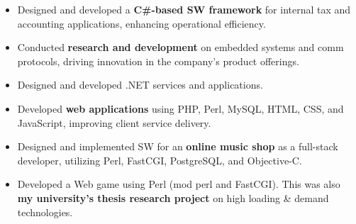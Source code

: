 \documentclass[10pt,a4paper]{altacv}
\begin{document}
\divider

\begin{itemize}
	\item Designed and developed a \textbf{C{\#}-based SW framework} for internal tax and accounting applications, enhancing operational efficiency.
\end{itemize}

\vfil \break

{}

\begin{itemize}
	\item Conducted \textbf{research and development} on embedded systems and comm protocols, driving innovation in the company’s product offerings.
	\item Designed and developed .NET services and applications.
\end{itemize}

\divider

\begin{itemize}
	\item Developed \textbf{web applications} using PHP, Perl, MySQL, HTML, CSS, and JavaScript, improving client service delivery.
\end{itemize}

\divider

\begin{itemize}
	\item Designed and implemented SW for an \textbf{online music shop} as a full-stack developer, utilizing Perl, FastCGI, PostgreSQL, and Objective-C.
\end{itemize}

\divider

\begin{itemize}
	\item Developed a Web game using Perl (mod perl and FastCGI). This was also \textbf{my university's thesis research project} on high loading \& demand technologies.
\end{itemize}

\divider
\end{document}
